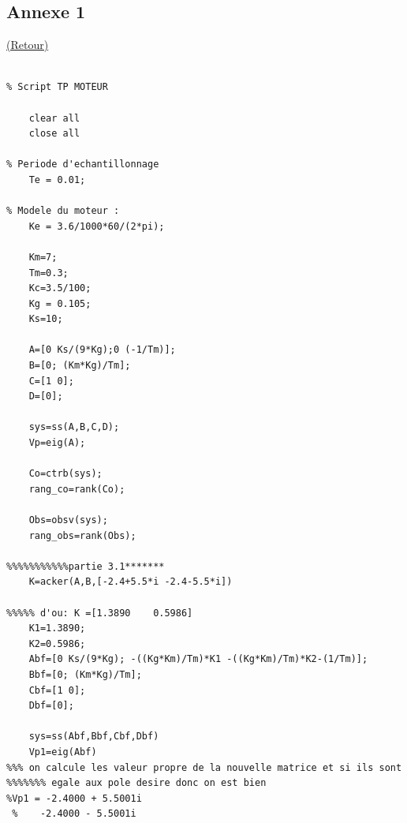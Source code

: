 \documentclass[12pt, a4paper, openany]{report}
\begin{document}
\begin{appendices}
\chapter*{Annexe 1}
	\hyperref[annexe1]{(Retour)}\label{section1.1}
	
	
\begin{lstlisting}
	
% Script TP MOTEUR

	clear all
	close all

% Periode d'echantillonnage
	Te = 0.01;

% Modele du moteur :
	Ke = 3.6/1000*60/(2*pi);

	Km=7;
	Tm=0.3;
	Kc=3.5/100;
	Kg = 0.105;
	Ks=10;

	A=[0 Ks/(9*Kg);0 (-1/Tm)];
	B=[0; (Km*Kg)/Tm];
	C=[1 0];
	D=[0];

	sys=ss(A,B,C,D);
	Vp=eig(A);

	Co=ctrb(sys);
	rang_co=rank(Co);

	Obs=obsv(sys);
	rang_obs=rank(Obs);

%%%%%%%%%%%partie 3.1*******
	K=acker(A,B,[-2.4+5.5*i -2.4-5.5*i])

%%%%% d'ou: K =[1.3890    0.5986]
	K1=1.3890;
	K2=0.5986;
	Abf=[0 Ks/(9*Kg); -((Kg*Km)/Tm)*K1 -((Kg*Km)/Tm)*K2-(1/Tm)];
	Bbf=[0; (Km*Kg)/Tm];
	Cbf=[1 0];
	Dbf=[0];

	sys=ss(Abf,Bbf,Cbf,Dbf)
	Vp1=eig(Abf)
%%% on calcule les valeur propre de la nouvelle matrice et si ils sont
%%%%%%% egale aux pole desire donc on est bien 
%Vp1 = -2.4000 + 5.5001i
 %    -2.4000 - 5.5001i
		
			    			
	\end{lstlisting}	
				
\end{appendices}





%
%
\end{document}
